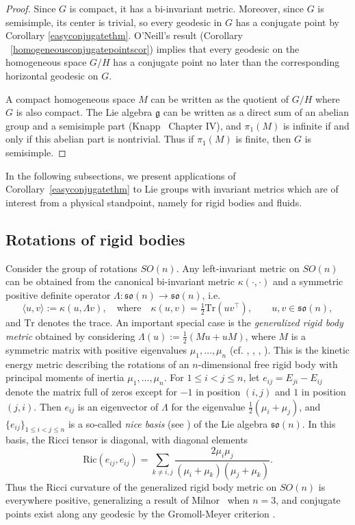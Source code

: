 \documentclass[oneside, 11pt]{amsart}
\numberwithin{equation}{section}
\newcommand{\so}{\mathfrak{so}}
\newcommand{\bim}{\kappa}
\newcommand{\unit}{E}
\newcommand{\son}{e}
\begin{document}
\begin{proof}
    Since $G$ is compact, it has a bi-invariant metric. Moreover, since $G$ is semisimple, its center is trivial, so every geodesic in $G$ has a conjugate point by Corollary \ref{easyconjugatethm}.
    O'Neill's result (Corollary ~\ref{homogeneousconjugatepointscor}) implies that every geodesic on the homogeneous space $G/H$ has a conjugate point no later than the corresponding horizontal geodesic on $G$.

    A compact homogeneous space $M$ can be written as the quotient of $G/H$ where $G$ is also compact. The Lie algebra $\mathfrak{g}$ can be written as a direct sum of an abelian group and a semisimple part (Knapp~\cite{Knapp} Chapter IV), and $\pi_1(M)$ is infinite if and only if this abelian part is nontrivial. Thus if $\pi_1(M)$ is finite, then $G$ is semisimple. 
\end{proof}


In the following subsections, we present applications of Corollary~\ref{easyconjugatethm} to Lie groups with invariant metrics which are of interest from a physical standpoint, namely for rigid bodies and fluids. 
 

\subsection{Rotations of rigid bodies}\label{rigid-body}
 
 

Consider the group of rotations $SO(n)$. Any left-invariant metric on $SO(n)$ can be obtained from the canonical bi-invariant metric $\kappa(\cdot,\cdot)$ and a symmetric positive definite operator $\Lambda:\so(n)\rightarrow\so(n)$, i.e.
\begin{equation}\label{son-metric}
\langle u,v\rangle:=\bim(u,\Lambda v),\quad\text{where}\quad \bim(u, v) = \tfrac{1}{2}\mathrm{Tr}(uv^\top), \qquad u,v\in\mathfrak{so}(n),
\end{equation}
and $\mathrm{Tr}$ denotes the trace. An important special case is the \emph{generalized rigid body metric} obtained by considering $\Lambda(u) := \frac{1}{2}(Mu + uM)$, where $M$ is a symmetric matrix with positive eigenvalues $\mu_1, \hdots, \mu_n$ (cf. \cite{Frahm}, \cite{Ratiu}, \cite{FM}, \cite{Manakov}). This is the kinetic energy metric describing the rotations of an $n$-dimensional free rigid body with principal moments of inertia $\mu_1,\hdots,\mu_n$. For $1\leq i<j\leq n$, let $\son_{ij}=\unit_{ji}-\unit_{ij}$ denote the matrix full of zeros except for $-1$ in position $(i,j)$ and $1$ in position $(j,i)$. Then $\son_{ij}$ is an eigenvector of $\Lambda$ for the eigenvalue $\frac{1}{2}(\mu_i+\mu_j)$, and $\{\son_{ij}\}_{1\leq i<j\leq n}$ is a so-called \emph{nice basis} (see \cite{Krishnan}) of the Lie algebra $\so(n)$. In this basis, the Ricci tensor is diagonal, with diagonal elements
$$\mathrm{Ric}(\son_{ij},\son_{ij})=\sum_{k\ne i,j}\frac{2\mu_i\mu_j}{(\mu_i+\mu_k)(\mu_j+\mu_k)}.$$
Thus the Ricci curvature of the generalized rigid body metric on $SO(n)$ is everywhere positive, generalizing a result of Milnor~\cite{Milnor} when $n=3$, and conjugate points exist along any geodesic by the Gromoll-Meyer criterion \cite{GM}. 
\end{document}
